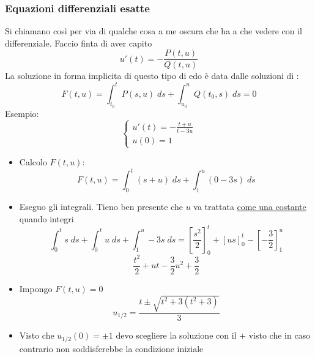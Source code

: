\subsubsection*{Equazioni differenziali esatte}
Si chiamano così per via di qualche cosa a me oscura che ha a che vedere con il differenziale. Faccio finta di aver capito
\[
	u'\left( t \right) = - \frac{P\left( t,u \right) }{Q \left( t,u \right) }
\]
La soluzione in forma implicita di questo tipo di edo è data dalle soluzioni di :
\[
	F\left( t,u \right) = \int_{t_0}^{t} P\left( s,u \right)  \; ds + \int_{u_0}^{u} Q\left( t_0,s \right)  \; ds =0
\]
Esempio:
\[
	\begin{cases}
		u'\left( t \right) =\displaystyle -\frac{t+u}{t-3u} \\
		u\left( 0 \right) =1
	\end{cases}
\]
\begin{itemize}
	\item Calcolo $ F\left( t,u \right)  $:
	      \[
		      F\left( t,u \right) = \int_{0}^{t} \left( s+u \right)  \; ds + \int_{1}^{u} \left( 0-3s \right)   \; ds
	      \]
	      \item Eseguo gli integrali. Tieno ben presente che $ u $ va trattata \underline{come una costante} quando integri
	      \[
	      \int_{0}^{t} s \; ds + \int_{0}^{t} u \; ds + \int_{1}^{u} -3s \; ds = \left[ \frac{s^2}{2} \right] _0 ^{t} + \left[ us \right] _0 ^{t} - \left[ -\frac{3}{2} \right] _1 ^{u}
	      \] 
	      \[
	      \frac{t^2}{2} + ut - \frac{3}{2}u^2 + \frac{3}{2}
	      \] 
	\item Impongo $ F\left( t,u \right)  =0$
	\[
	u_{1 / 2}= \frac{t \pm \sqrt{t^2 + 3\left( t^2 + 3 \right) } }{3} 
	\] 
	\item Visto che $ u_{1/2}\left( 0 \right) = \pm 1 $ devo scegliere la soluzione con il $ + $ visto che in caso contrario non soddisferebbe la condizione iniziale
\end{itemize}

